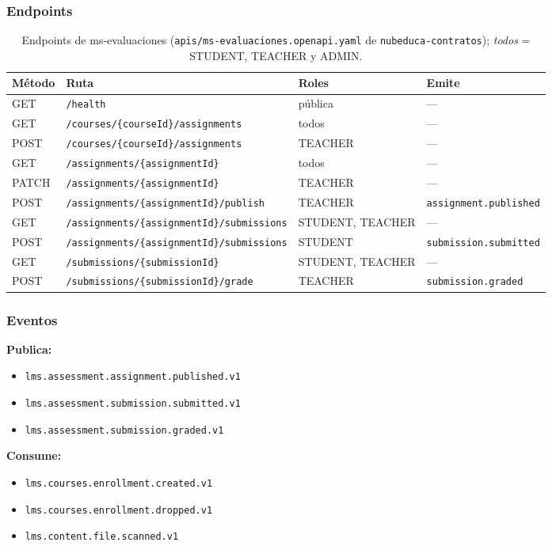\subsubsection{Endpoints}
\begin{table}[htbp]
\centering\footnotesize
\begin{tabularx}{\textwidth}{lXll}
\toprule
Método & Ruta & Roles & Emite \\
\midrule
GET    & \texttt{/health} & pública & --- \\
GET    & \texttt{/courses/\{courseId\}/assignments} & todos & --- \\
POST   & \texttt{/courses/\{courseId\}/assignments} & TEACHER & --- \\
GET    & \texttt{/assignments/\{assignmentId\}} & todos & --- \\
PATCH  & \texttt{/assignments/\{assignmentId\}} & TEACHER & --- \\
POST   & \texttt{/assignments/\{assignmentId\}/publish} & TEACHER & \texttt{assignment.published} \\
GET    & \texttt{/assignments/\{assignmentId\}/submissions} & STUDENT, TEACHER & --- \\
POST   & \texttt{/assignments/\{assignmentId\}/submissions} & STUDENT & \texttt{submission.submitted} \\
GET    & \texttt{/submissions/\{submissionId\}} & STUDENT, TEACHER & --- \\
POST   & \texttt{/submissions/\{submissionId\}/grade} & TEACHER & \texttt{submission.graded} \\
\bottomrule
\end{tabularx}
\caption{Endpoints de ms-evaluaciones (\texttt{apis/ms-evaluaciones.openapi.yaml} de \texttt{nubeduca-contratos}); \textit{todos} = STUDENT, TEACHER y ADMIN.}
\end{table}

\subsubsection{Eventos}
\textbf{Publica:}
\begin{itemize}
  \item \texttt{lms.assessment.assignment.published.v1}
  \item \texttt{lms.assessment.submission.submitted.v1}
  \item \texttt{lms.assessment.submission.graded.v1}
\end{itemize}

\textbf{Consume:}
\begin{itemize}
  \item \texttt{lms.courses.enrollment.created.v1}
  \item \texttt{lms.courses.enrollment.dropped.v1}
  \item \texttt{lms.content.file.scanned.v1}
\end{itemize}


